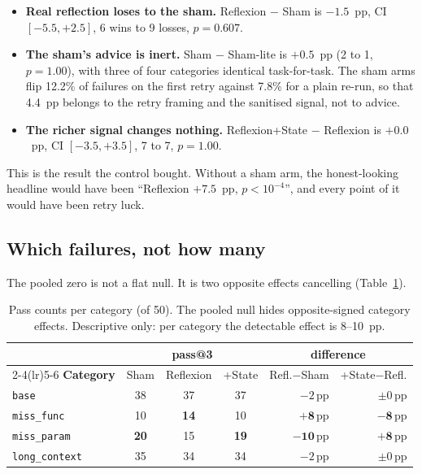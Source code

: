\documentclass[a4paper, 12pt]{article}
\begin{document}
\begin{itemize}\itemsep2pt
\item \textbf{Real reflection loses to the sham.} Reflexion $-$ Sham is
  $\mathbf{-1.5}$~pp, CI $[-5.5,+2.5]$, 6 wins to 9 losses, $p=0.607$.
\item \textbf{The sham's advice is inert.} Sham $-$ Sham-lite is $+0.5$~pp
    (2 to 1, $p=1.00$), with three of four categories identical task-for-task. The
    sham arms flip 12.2\% of failures on the first retry against 7.8\% for a plain
    re-run, so that 4.4~pp belongs to the retry framing and the sanitised signal,
    not to advice.
\item \textbf{The richer signal changes nothing.} Reflexion+State $-$ Reflexion
  is $\mathbf{+0.0}$~pp, CI $[-3.5,+3.5]$, 7 to 7, $p=1.00$.
\end{itemize}

This is the result the control bought. Without a sham arm, the honest-looking
headline would have been ``Reflexion $+7.5$~pp, $p<10^{-4}$'', and every point
of it would have been retry luck.

\subsection{Which failures, not how many}
\label{sec:which}

The pooled zero is not a flat null. It is two opposite effects cancelling
(Table~\ref{tab:categories}).

\begin{table}[t]
\centering\footnotesize
\caption{Pass counts per category (of 50). The pooled null hides
opposite-signed category effects. Descriptive only: per category the detectable
effect is 8--10~pp.}
\label{tab:categories}
\begin{tabular}{@{}lcccrr@{}}
\toprule
& \multicolumn{3}{c}{\textbf{pass@3}} & \multicolumn{2}{c}{\textbf{difference}} \\
\cmidrule(lr){2-4}\cmidrule(lr){5-6}
\textbf{Category} & Sham & Reflexion & +State & Refl.$-$Sham & +State$-$Refl. \\
\midrule
\texttt{base}          & 38 & 37 & 37 & $-2$\,pp  & $\pm0$\,pp \\
\texttt{miss\_func}    & 10 & \textbf{14} & 10 & $\mathbf{+8}$\,pp & $\mathbf{-8}$\,pp \\
\texttt{miss\_param}   & \textbf{20} & 15 & \textbf{19} & $\mathbf{-10}$\,pp & $\mathbf{+8}$\,pp \\
\texttt{long\_context} & 35 & 34 & 34 & $-2$\,pp  & $\pm0$\,pp \\
\bottomrule
\end{tabular}
\end{table}
\end{document}
